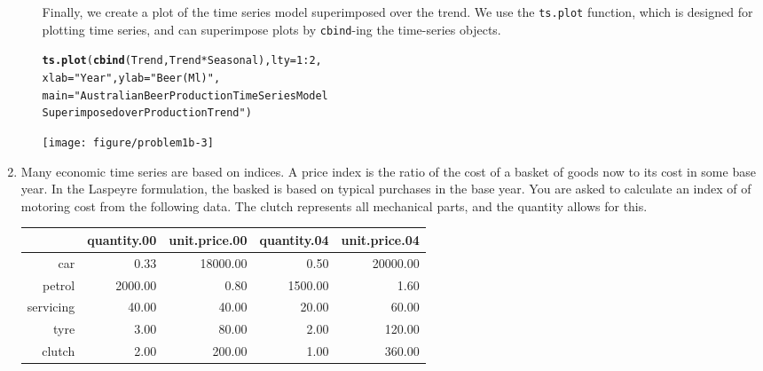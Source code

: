 \documentclass{article}\usepackage[]{graphicx}\usepackage[]{color}
\makeatletter
\newcommand{\hlnum}[1]{\textcolor[rgb]{0.686,0.059,0.569}{#1}}%
\newcommand{\hlstr}[1]{\textcolor[rgb]{0.192,0.494,0.8}{#1}}%
\newcommand{\hlopt}[1]{\textcolor[rgb]{0,0,0}{#1}}%
\newcommand{\hlstd}[1]{\textcolor[rgb]{0.345,0.345,0.345}{#1}}%
\newcommand{\hlkwc}[1]{\textcolor[rgb]{0.333,0.667,0.333}{#1}}%
\newcommand{\hlkwd}[1]{\textcolor[rgb]{0.737,0.353,0.396}{\textbf{#1}}}%
\newenvironment{kframe}{%
 \def\at@end@of@kframe{}%
 \ifinner\ifhmode%
  \def\at@end@of@kframe{\end{minipage}}%
  \begin{minipage}{\columnwidth}%
 \fi\fi%
 \def\FrameCommand##1{\hskip\@totalleftmargin \hskip-\fboxsep
 \colorbox{shadecolor}{##1}\hskip-\fboxsep
     \hskip-\linewidth \hskip-\@totalleftmargin \hskip\columnwidth}%
 \MakeFramed {\advance\hsize-\width
   \@totalleftmargin\z@ \linewidth\hsize
   \@setminipage}}%
 {\par\unskip\endMakeFramed%
 \at@end@of@kframe}
\newenvironment{knitrout}{}{} %
\makeatother
\begin{document}
\begin{enumerate}
\begin{enumerate}
\begin{knitrout}
\end{knitrout}

\newpage
Finally, we create a plot of the time series model superimposed over the trend. We use the \texttt{ts.plot} function, which is designed for plotting time series, and can superimpose plots by \texttt{cbind}-ing the time-series objects. 

\begin{knitrout}
\color{fgcolor}\begin{kframe}
\begin{alltt}
\hlkwd{ts.plot}\hlstd{(}\hlkwd{cbind}\hlstd{(Trend, Trend}\hlopt{*}\hlstd{Seasonal),} \hlkwc{lty}\hlstd{=}\hlnum{1}\hlopt{:}\hlnum{2}\hlstd{,}
        \hlkwc{xlab}\hlstd{=}\hlstr{"Year"}\hlstd{,} \hlkwc{ylab}\hlstd{=}\hlstr{"Beer (Ml)"}\hlstd{,}
        \hlkwc{main}\hlstd{=}\hlstr{"Australian Beer Production Time Series Model
        Superimposed over Production Trend"}\hlstd{)}
\end{alltt}
\end{kframe}
\texttt{[image: figure/problem1b-3]} 

\end{knitrout}


\end{enumerate}
\newpage
\item Many economic time series are based on indices. A price index is the ratio of the cost of a basket of goods now to its cost in some base year. In the Laspeyre formulation, the basked is based on typical purchases in the base year. You are asked to calculate an index of of motoring cost from the following data. The clutch represents all mechanical parts, and the quantity allows for this.
\begin{table}[ht]
\centering
\begin{tabular}{rrrrr}
  \hline
 & quantity.00 & unit.price.00 & quantity.04 & unit.price.04 \\ 
  \hline
car & 0.33 & 18000.00 & 0.50 & 20000.00 \\ 
  petrol & 2000.00 & 0.80 & 1500.00 & 1.60 \\ 
  servicing & 40.00 & 40.00 & 20.00 & 60.00 \\ 
  tyre & 3.00 & 80.00 & 2.00 & 120.00 \\ 
  clutch & 2.00 & 200.00 & 1.00 & 360.00 \\ 
   \hline
\end{tabular}
\end{table}



\end{enumerate}
\end{document}
